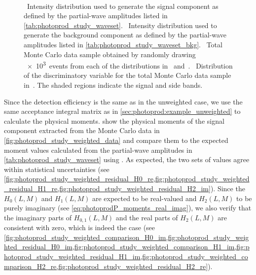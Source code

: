 \begin{figure}[tbp]
  \centering%
  \\%
  \caption{~Intensity
  distribution used to generate the signal component as defined by the
  partial-wave amplitudes listed in
  \cref{tab:photoprod_study_waveset}.
  ~Intensity
  distribution used to generate the background component as defined by
  the partial-wave amplitudes listed in
  \cref{tab:photoprod_study_waveset_bkg}.
  ~Total Monte
  Carlo data sample obtained by randomly drawing \num{e3}~events from
  each of the distributions
  in~
  and~.
  ~Distribution
  of the discriminatory variable for the total Monte Carlo data sample
  in~.  The
  shaded regions indicate the signal and side bands.}%
  \label{fig:photoprod_study_weighted_input}%
\end{figure}

Since the detection efficiency is the same as in the unweighted case,
we use the same acceptance integral matrix as in
\cref{sec:photoprod:example_unweighted} to calculate the physical
moments.
show the physical moments of the signal component extracted from the
Monte Carlo data in \cref{fig:photoprod_study_weighted_data} and
compare them to the expected moment values calculated from the
partial-wave amplitudes in \cref{tab:photoprod_study_waveset} using
.
As expected, the two sets of values  agree within statistical
uncertainties (see
\cref{fig:photoprod_study_weighted_residual_H0_re,fig:photoprod_study_weighted_residual_H1_re,fig:photoprod_study_weighted_residual_H2_im}).
Since the $H_0(L, M)$ and $H_1(L, M)$ are expected to be real-valued
and $H_2(L, M)$ to be purely imaginary (see
\cref{eq:photoprodP_moments_real_imag}), we also verify that the
imaginary parts of $H_{0, 1}(L, M)$ and the real parts of $H_2(L, M)$
are consistent with zero, which is indeed the case (see
\cref{fig:photoprod_study_weighted_comparison_H0_im,fig:photoprod_study_weighted_residual_H0_im,fig:photoprod_study_weighted_comparison_H1_im,fig:photoprod_study_weighted_residual_H1_im,fig:photoprod_study_weighted_comparison_H2_re,fig:photoprod_study_weighted_residual_H2_re}).

